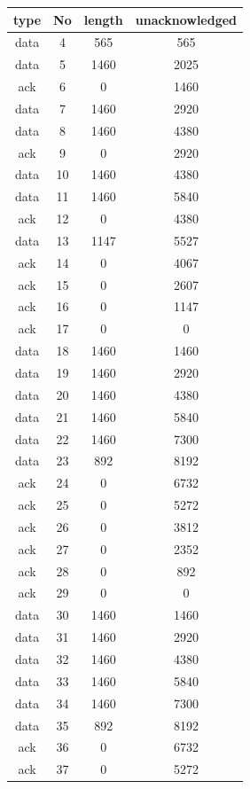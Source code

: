 \documentclass[a4paper,11pt,final]{report}
\begin{document}
\begin{longtable}{|c|c|c|c|}
	\hline
type & No & length & unacknowledged \\ \hline
\endhead
data & 4 & 565 & 565 \\ \hline
data & 5 & 1460 & 2025 \\ \hline
ack & 6 & 0 & 1460 \\ \hline
data & 7 & 1460 & 2920 \\ \hline
data & 8 & 1460 & 4380 \\ \hline
ack & 9 & 0 & 2920 \\ \hline
data & 10 & 1460 & 4380 \\ \hline
data & 11 & 1460 & 5840 \\ \hline
ack & 12 & 0 & 4380 \\ \hline
data & 13 & 1147 & 5527 \\ \hline
ack & 14 & 0 & 4067 \\ \hline
ack & 15 & 0 & 2607 \\ \hline
ack & 16 & 0 & 1147 \\ \hline
ack & 17 & 0 & 0 \\ \hline
data & 18 & 1460 & 1460 \\ \hline
data & 19 & 1460 & 2920 \\ \hline
data & 20 & 1460 & 4380 \\ \hline
data & 21 & 1460 & 5840 \\ \hline
data & 22 & 1460 & 7300 \\ \hline
data & 23 & 892 & 8192 \\ \hline
ack & 24 & 0 & 6732 \\ \hline
ack & 25 & 0 & 5272 \\ \hline
ack & 26 & 0 & 3812 \\ \hline
ack & 27 & 0 & 2352 \\ \hline
ack & 28 & 0 & 892 \\ \hline
ack & 29 & 0 & 0 \\ \hline
data & 30 & 1460 & 1460 \\ \hline
data & 31 & 1460 & 2920 \\ \hline
data & 32 & 1460 & 4380 \\ \hline
data & 33 & 1460 & 5840 \\ \hline
data & 34 & 1460 & 7300 \\ \hline
data & 35 & 892 & 8192 \\ \hline
ack & 36 & 0 & 6732 \\ \hline
ack & 37 & 0 & 5272 \\ \hline

\end{longtable}
\end{document}
